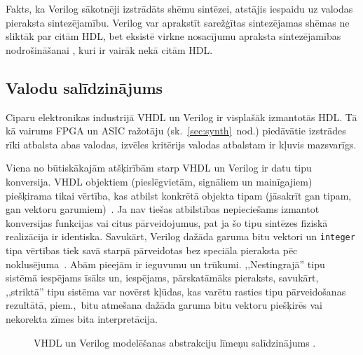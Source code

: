 	Fakts, ka Verilog sākotnēji izstrādāts shēmu sintēzei, atstājis iespaidu
	uz valodas pieraksta sintezējamību. Verilog var aprakstīt sarežģītas
	sintezējamas shēmas ne sliktāk par citām HDL, bet eksistē virkne
	nosacījumu apraksta sintezējamības nodrošināšanai \cite{ieee-1364.1},
	kuri ir vairāk nekā citām HDL.
	


\clearpage
\subsection{Valodu salīdzinājums} \label{sec:hdl-comparison}
	Ciparu elektronikas industrijā VHDL un Verilog ir visplašāk izmantotās
	HDL. Tā kā vairums FPGA un ASIC ražotāju (sk.~\ref{sec:synth}~nod.)
	piedāvātie izstrādes rīki atbalsta abas valodas, izvēles kritērijs
	valodas atbalstam ir kļuvis mazsvarīgs.
	
	Viena no būtiskākajām atšķirībām starp VHDL un Verilog ir datu tipu
	konversija. VHDL objektiem (pieslēgvietām, signāliem un mainīgajiem)
	piešķirama tikai vērtība, kas atbilst konkrētā objekta tipam
	(jāsakrīt gan tipam, gan vektoru garumiem)~\cite{vhdl-vs-verilog}.
	Ja nav tiešas atbilstības
	nepieciešams izmantot konversijas funkcijas vai citus pārvei\-do\-jumus,
	pat ja šo tipu sintēzes fiziskā realizācija ir identiska.
	Savukārt, Verilog
	dažāda garuma bitu vektori un \texttt{integer} tipa vērtības tiek
	savā starpā pārveidotas bez speciāla pieraksta pēc noklusējuma~\cite{vhdl-vs-verilog}.
	Abām pieejām ir 
	ieguvumu un trūkumi. ,,Nestingrajā'' tipu sistēmā iespējams īsāks un,
	iespējams, pārskatāmāks pieraksts, savukārt, ,,striktā'' tipu sistēma
	var novērst kļūdas, kas varētu rasties tipu pārveidošanas rezultātā,
	piem.,~bitu atmešana dažāda garuma bitu vektoru piešķirēs vai nekorekta
	zīmes bita interpretācija.
	
	\begin{figure}[thb]
		\centering
		\def\svgwidth{\textwidth}
		
		\caption[VHDL un Verilog modelēšanas abstrakciju līmeņu salīdzinājums.]%
		        {VHDL un Verilog modelēšanas abstrakciju līmeņu salīdzinājums \cite{vhdl-vs-verilog}.}
		\label{fig:abstractions}
	\end{figure}
	
